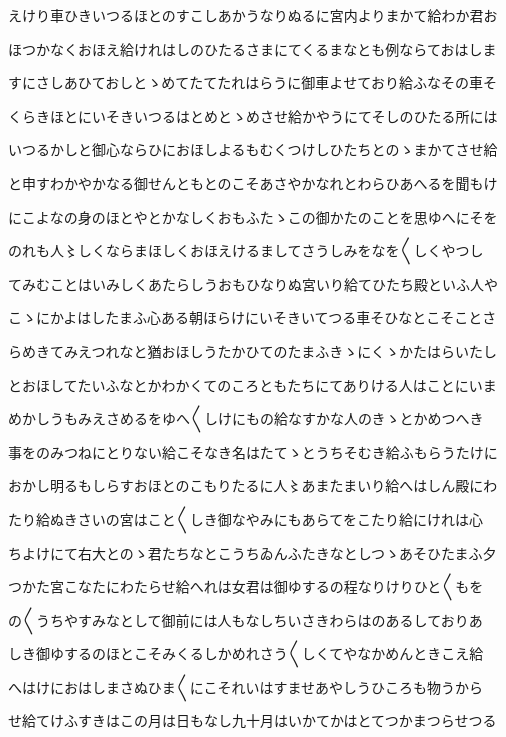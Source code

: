 \documentclass[a4paper,11pt,landscape]{ltjtarticle}
\begin{document}
えけり車ひきいつるほとのすこしあかうなりぬるに宮内よりまかて給わか君お
\par\medskip
ほつかなくおほえ給けれはしのひたるさまにてくるまなとも例ならておはしま
\par\medskip
すにさしあひておしとゝめてたてたれはらうに御車よせており給ふなその車そ
\par\medskip
くらきほとにいそきいつるはとめとゝめさせ給かやうにてそしのひたる所には
\par\medskip
いつるかしと御心ならひにおほしよるもむくつけしひたちとのゝまかてさせ給
\par\medskip
と申すわかやかなる御せんともとのこそあさやかなれとわらひあへるを聞もけ
\par\medskip
にこよなの身のほとやとかなしくおもふたゝこの御かたのことを思ゆへにそを
\par\medskip
のれも人〻しくならまほしくおほえけるましてさうしみをなを〱しくやつし
\par\medskip
てみむことはいみしくあたらしうおもひなりぬ宮いり給てひたち殿といふ人や
\par\medskip
こゝにかよはしたまふ心ある朝ほらけにいそきいてつる車そひなとこそことさ
\par\medskip
らめきてみえつれなと猶おほしうたかひてのたまふきゝにくゝかたはらいたし
\par\medskip
とおほしてたいふなとかわかくてのころともたちにてありける人はことにいま
\par\medskip
めかしうもみえさめるをゆへ〱しけにもの給なすかな人のきゝとかめつへき
\par\medskip
事をのみつねにとりない給こそなき名はたてゝとうちそむき給ふもらうたけに
\par\medskip
おかし明るもしらすおほとのこもりたるに人〻あまたまいり給へはしん殿にわ
\par\medskip
たり給ぬきさいの宮はこと〱しき御なやみにもあらてをこたり給にけれは心
\par\medskip
ちよけにて右大とのゝ君たちなとこうちゐんふたきなとしつゝあそひたまふ夕
\par\medskip
つかた宮こなたにわたらせ給へれは女君は御ゆするの程なりけりひと〱もを
\par\medskip
の〱うちやすみなとして御前には人もなしちいさきわらはのあるしておりあ
\par\medskip
しき御ゆするのほとこそみくるしかめれさう〱しくてやなかめんときこえ給
\par\medskip
へはけにおはしまさぬひま〱にこそれいはすませあやしうひころも物うから
\par\medskip
せ給てけふすきはこの月は日もなし九十月はいかてかはとてつかまつらせつる
\end{document}
